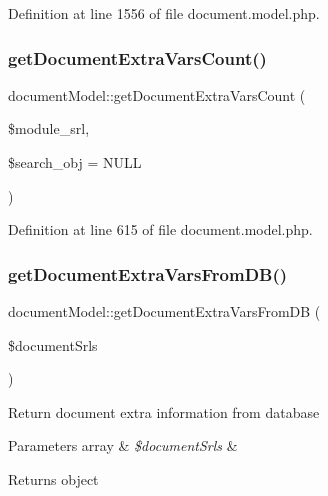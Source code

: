 Definition at line 1556 of file document.\+model.\+php.

\mbox{\label{classdocumentModel_a91d03a635279fda1053a111ce13414b7}} 
\subsubsection{\texorpdfstring{get\+Document\+Extra\+Vars\+Count()}{getDocumentExtraVarsCount()}}
{\footnotesize\ttfamily document\+Model\+::get\+Document\+Extra\+Vars\+Count (\begin{DoxyParamCaption}\item[{}]{\$module\+\_\+srl,  }\item[{}]{\$search\+\_\+obj = {\ttfamily NULL} }\end{DoxyParamCaption})}



Definition at line 615 of file document.\+model.\+php.

\mbox{\label{classdocumentModel_a10167011009da59ed649022e7ec42a39}} 
\subsubsection{\texorpdfstring{get\+Document\+Extra\+Vars\+From\+D\+B()}{getDocumentExtraVarsFromDB()}}
{\footnotesize\ttfamily document\+Model\+::get\+Document\+Extra\+Vars\+From\+DB (\begin{DoxyParamCaption}\item[{}]{\$document\+Srls }\end{DoxyParamCaption})}

Return document extra information from database 
\begin{DoxyParams}[1]{Parameters}
array & {\em \$document\+Srls} & \\
\hline
\end{DoxyParams}
\begin{DoxyReturn}{Returns}
object 
\end{DoxyReturn}


